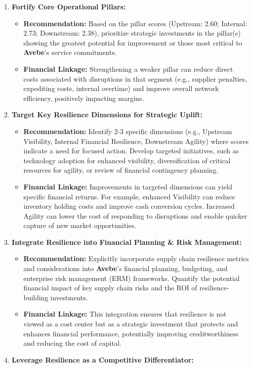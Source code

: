\documentclass[
  oneside,
  open=any,
  fontsize=11pt]{scrbook}
\providecommand{\tightlist}{%
  \setlength{\itemsep}{0pt}\setlength{\parskip}{0pt}}
\begin{document}
\begin{enumerate}
\def\labelenumi{\arabic{enumi}.}
\tightlist
\item
  \textbf{Fortify Core Operational Pillars:}

  \begin{itemize}
  \tightlist
  \item
    \textbf{Recommendation:} Based on the pillar scores (Upstream: 2.60;
    Internal: 2.73; Downstream: 2.38), prioritize strategic investments
    in the pillar(s) showing the greatest potential for improvement or
    those most critical to \textbf{Avebe}'s service commitments.
  \item
    \textbf{Financial Linkage:} Strengthening a weaker pillar can reduce
    direct costs associated with disruptions in that segment (e.g.,
    supplier penalties, expediting costs, internal overtime) and improve
    overall network efficiency, positively impacting margins.
  \end{itemize}
\item
  \textbf{Target Key Resilience Dimensions for Strategic Uplift:}

  \begin{itemize}
  \tightlist
  \item
    \textbf{Recommendation:} Identify 2-3 specific dimensions (e.g.,
    Upstream Visibility, Internal Financial Resilience, Downstream
    Agility) where scores indicate a need for focused action. Develop
    targeted initiatives, such as technology adoption for enhanced
    visibility, diversification of critical resources for agility, or
    review of financial contingency planning.
  \item
    \textbf{Financial Linkage:} Improvements in targeted dimensions can
    yield specific financial returns. For example, enhanced Visibility
    can reduce inventory holding costs and improve cash conversion
    cycles. Increased Agility can lower the cost of responding to
    disruptions and enable quicker capture of new market opportunities.
  \end{itemize}
\item
  \textbf{Integrate Resilience into Financial Planning \& Risk
  Management:}

  \begin{itemize}
  \tightlist
  \item
    \textbf{Recommendation:} Explicitly incorporate supply chain
    resilience metrics and considerations into \textbf{Avebe}'s
    financial planning, budgeting, and enterprise risk management (ERM)
    frameworks. Quantify the potential financial impact of key supply
    chain risks and the ROI of resilience-building investments.
  \item
    \textbf{Financial Linkage:} This integration ensures that resilience
    is not viewed as a cost center but as a strategic investment that
    protects and enhances financial performance, potentially improving
    creditworthiness and reducing the cost of capital.
  \end{itemize}
\item
  \textbf{Leverage Resilience as a Competitive Differentiator:}


\end{enumerate}
\end{document}
